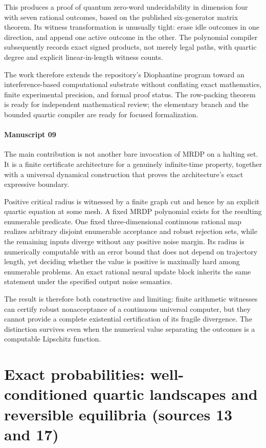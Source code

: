 \documentclass[11pt,letterpaper]{article}
\numberwithin{equation}{section}
\theoremstyle{definition}
\theoremstyle{remark}
\begin{document}
This produces a proof of quantum zero-word undecidability in dimension four with seven rational outcomes, based on the published six-generator matrix theorem. Its witness transformation is unusually tight: erase idle outcomes in one direction, and append one active outcome in the other. The polynomial compiler subsequently records exact signed products, not merely legal paths, with quartic degree and explicit linear-in-length witness counts.

The work therefore extends the repository's Diophantine program toward an interference-based computational substrate without conflating exact mathematics, finite experimental precision, and formal proof status. The row-packing theorem is ready for independent mathematical review; the elementary branch and the bounded quartic compiler are ready for focused formalization.

\subsection{Manuscript 09}
The main contribution is not another bare invocation of MRDP on a halting
set.  It is a finite certificate architecture for a genuinely infinite-time
property, together with a universal dynamical construction that proves the
architecture's exact expressive boundary.

Positive critical radius is witnessed by a finite graph cut and hence by an
explicit quartic equation at some mesh.  A fixed MRDP polynomial exists for
the resulting enumerable predicate.  One fixed three-dimensional continuous
rational map realizes arbitrary disjoint enumerable acceptance and robust
rejection sets, while the remaining inputs diverge without any positive
noise margin.  Its radius is numerically computable with an error bound that
does not depend on trajectory length, yet deciding whether the value is
positive is maximally hard among enumerable problems.  An exact rational
neural update block inherits the same statement under the specified output
noise semantics.

The result is therefore both constructive and limiting: finite arithmetic
witnesses can certify robust nonacceptance of a continuous universal computer,
but they cannot provide a complete existential certification of its fragile
divergence.  The distinction survives even when the numerical value separating
the outcomes is a computable Lipschitz function.

\part{Exact probabilities: well-conditioned quartic landscapes and reversible equilibria (sources 13 and 17)}
\label{pqc:part:b62-V}
\end{document}
